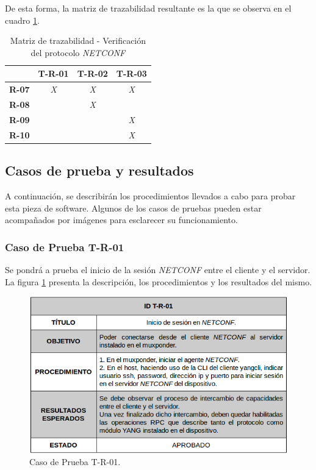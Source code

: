 De esta forma, la matriz de trazabilidad resultante es la que se observa en el cuadro \ref{tab:matriz_netconf}.

\begin{table}[!h]
    \centering
    \begin{tabular}{|c|c|c|c|}
    \hline
                  & \textbf{T-R-01} & \textbf{T-R-02} & \textbf{T-R-03} \\ \hline
    \textbf{R-07} & \textit{X}      & \textit{X}      & \textit{X}      \\ \hline
    \textbf{R-08} & \textit{}       & \textit{X}      & \textit{}       \\ \hline
    \textbf{R-09} & \textit{}       & \textit{}       & \textit{X}      \\ \hline
    \textbf{R-10} & \textit{}       & \textit{}       & \textit{X}      \\ \hline
    \end{tabular}
    \caption{Matriz de trazabilidad - Verificación del protocolo \textit{NETCONF}}
    \label{tab:matriz_netconf}
\end{table}


\subsection{Casos de prueba y resultados}

A continuación, se describirán los procedimientos llevados a cabo para probar esta pieza de software. Algunos de los casos de pruebas pueden estar acompañados por imágenes para esclarecer su funcionamiento.

\subsubsection{Caso de Prueba T-R-01}
Se pondrá a prueba el inicio de la sesión \textit{NETCONF} entre el cliente y el servidor. La figura \ref{fig:test1} presenta la descripción, los procedimientos y los resultados del mismo. 


\begin{figure}[H]
	\centering
	\includegraphics[scale=0.6]{Figures/test_uno.png}
	\caption{Caso de Prueba T-R-01.}
	\label{fig:test1}
  \end{figure}


